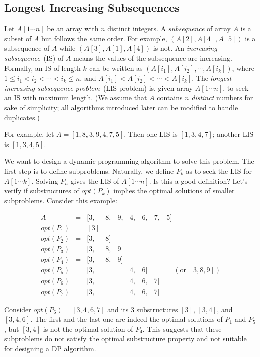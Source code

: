 \subsection*{Longest Increasing Subsequences}

Let $A[1\cdots n]$ be an array with $n$ distinct integers.
A \emph{subsequence} of array $A$ is a subset of $A$ but follows
the same order. For example, $(A[2], A[4], A[5])$ is a subsequence of $A$
while $(A[3], A[1], A[4])$ is not.
An \emph{increasing subsequence}~(IS) of $A$ means the values of the
subsequence are increasing.
Formally, an IS of length $k$ can be written
as $(A[i_1], A[i_2], \cdots, A[i_k])$, where $1\le i_1 < i_2 < \cdots < i_k \le n$,
and $A[i_1] < A[i_2] < \cdots < A[i_k]$.
The \emph{longest increasing subsequence problem}~(LIS problem) is, given array $A[1\cdots n]$,
to seek an IS with maximum length.
(We assume that $A$ contains $n$ \emph{distinct} numbers for sake
of simplicity; all algorithms introduced later can be modified to handle duplicates.)

For example, let $A = [1, 8, 3, 9, 4, 7, 5]$. Then one LIS is $[1, 3, 4, 7]$; %
another LIS is $[1, 3, 4, 5]$.

We want to design a dynamic programming algorithm to solve this problem.
The first step is to define subproblems. Naturally, we define $P_k$
as to seek the LIS for $A[1\cdots k]$. Solving $P_n$ gives the LIS
of $A[1\cdots n]$. Is this a good definition? Let's verify if substructures
of $opt(P_k)$ implies the optimal solutions of smaller subproblems.
Consider this example:

\begin{displaymath}
\begin{array}{rllllllll}
A & = & [3, &8, &9, &4, &6, &7, &5] \\
opt(P_1) &=& [3] \\
opt(P_2) &=& [3, &8] \\
opt(P_3) &=& [3, &8, &9] \\
opt(P_4) &=& [3, &8, &9] \\
opt(P_5) &=& [3, &&&4, &6] &&\quad (\textrm{or } [3, 8, 9]) \\
opt(P_6) &=& [3, &&&4, &6, &7] \\
opt(P_7) &=& [3, &&&4, &6, &7]
\end{array}
\end{displaymath}

Consider $opt(P_6) = [3, 4, 6, 7]$ and its 3 substructures $[3]$, $[3, 4]$, and $[3, 4, 6]$.
The first and the last one are indeed the optimal solutions of $P_1$ and $P_5$,
but $[3, 4]$ is not the optimal solution of $P_4$.
This suggests that these subproblems do not satisfy the optimal substructure property and
not suitable for designing a DP algorithm.

